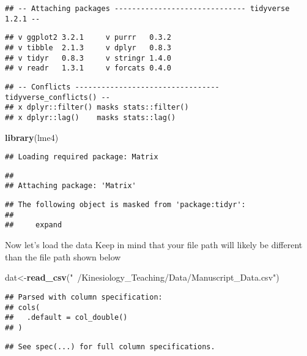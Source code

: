 \documentclass[
]{article}
\newenvironment{Shaded}{\begin{snugshade}}{\end{snugshade}}
\newcommand{\KeywordTok}[1]{\textcolor[rgb]{0.13,0.29,0.53}{\textbf{#1}}}
\newcommand{\NormalTok}[1]{#1}
\newcommand{\StringTok}[1]{\textcolor[rgb]{0.31,0.60,0.02}{#1}}
\begin{document}
\begin{verbatim}
## -- Attaching packages ------------------------------ tidyverse 1.2.1 --
\end{verbatim}

\begin{verbatim}
## v ggplot2 3.2.1     v purrr   0.3.2
## v tibble  2.1.3     v dplyr   0.8.3
## v tidyr   0.8.3     v stringr 1.4.0
## v readr   1.3.1     v forcats 0.4.0
\end{verbatim}

\begin{verbatim}
## -- Conflicts --------------------------------- tidyverse_conflicts() --
## x dplyr::filter() masks stats::filter()
## x dplyr::lag()    masks stats::lag()
\end{verbatim}

\begin{Shaded}
\begin{Highlighting}[]
\KeywordTok{library}\NormalTok{(lme4)}
\end{Highlighting}
\end{Shaded}

\begin{verbatim}
## Loading required package: Matrix
\end{verbatim}

\begin{verbatim}
## 
## Attaching package: 'Matrix'
\end{verbatim}

\begin{verbatim}
## The following object is masked from 'package:tidyr':
## 
##     expand
\end{verbatim}

Now let's load the data Keep in mind that your file path will likely be
different than the file path shown below

\begin{Shaded}
\begin{Highlighting}[]
\NormalTok{dat<-}\KeywordTok{read_csv}\NormalTok{(}\StringTok{"~/Kinesiology_Teaching/Data/Manuscript_Data.csv"}\NormalTok{)}
\end{Highlighting}
\end{Shaded}

\begin{verbatim}
## Parsed with column specification:
## cols(
##   .default = col_double()
## )
\end{verbatim}

\begin{verbatim}
## See spec(...) for full column specifications.
\end{verbatim}
\end{document}
